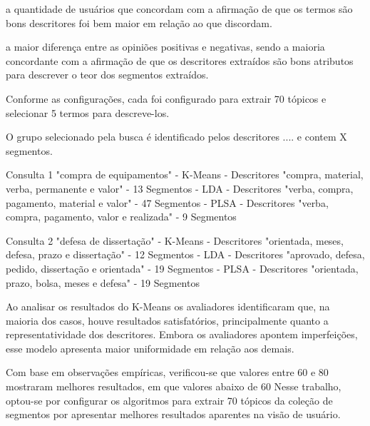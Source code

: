 a quantidade de usuários que concordam com a afirmação de que os termos são bons descritores foi bem maior em relação ao que discordam.


a maior diferença entre as opiniões positivas e negativas, sendo a maioria concordante com a afirmação de que os descritores extraídos são bons atributos para descrever o teor dos segmentos extraídos.








Conforme as configurações, cada foi configurado para extrair 70 tópicos e selecionar 5 termos para descreve-los. 

O grupo selecionado pela busca é identificado pelos descritores .... e contem X segmentos.

Consulta 1 "compra de equipamentos"
	- K-Means 
		- Descritores "compra, material, verba, permanente e valor"
		- 13 Segmentos
	- LDA
		- Descritores "verba, compra, pagamento, material e valor"
		- 47 Segmentos
	- PLSA
		- Descritores "verba, compra, pagamento, valor e realizada"
		- 9 Segmentos

Consulta 2 "defesa de dissertação"
	- K-Means 
		- Descritores "orientada, meses, defesa, prazo e dissertação"
		- 12 Segmentos
	- LDA
		- Descritores "aprovado, defesa, pedido, dissertação e orientada"
		- 19 Segmentos
	- PLSA
		- Descritores "orientada, prazo, bolsa, meses e defesa"
		- 19 Segmentos









Ao analisar os resultados do K-Means os avaliadores identificaram que, na maioria dos casos, houve resultados satisfatórios, principalmente quanto a representatividade dos descritores. Embora os avaliadores apontem imperfeições, esse modelo apresenta maior uniformidade em relação aos demais.


Com base em observações empíricas, verificou-se que valores entre 60 e 80 mostraram melhores resultados, em que valores abaixo de 60 Nesse trabalho, optou-se por configurar os algoritmos para extrair 70 tópicos da coleção de segmentos por apresentar melhores resultados aparentes na visão de usuário.



